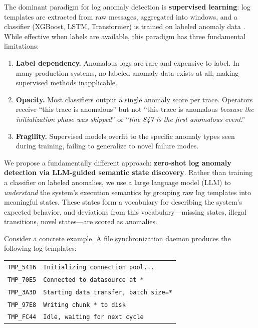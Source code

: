 \documentclass[11pt]{article}
\begin{document}
The dominant paradigm for log anomaly detection is \textbf{supervised learning}: log templates are extracted from raw messages, aggregated into windows, and a classifier (XGBoost, LSTM, Transformer) is trained on labeled anomaly data \cite{du2017deeplog,zhang2019robust,guo2021logbert}. While effective when labels are available, this paradigm has three fundamental limitations:

\begin{enumerate}[leftmargin=*,itemsep=2pt]
    \item \textbf{Label dependency.} Anomalous logs are rare and expensive to label. In many production systems, no labeled anomaly data exists at all, making supervised methods inapplicable.
    \item \textbf{Opacity.} Most classifiers output a single anomaly score per trace. Operators receive ``this trace is anomalous'' but not ``this trace is anomalous \emph{because the initialization phase was skipped}'' or ``\emph{line 847 is the first anomalous event}.''
    \item \textbf{Fragility.} Supervised models overfit to the specific anomaly types seen during training, failing to generalize to novel failure modes.
\end{enumerate}

We propose a fundamentally different approach: \textbf{zero-shot log anomaly detection via LLM-guided semantic state discovery}. Rather than training a classifier on labeled anomalies, we use a large language model (LLM) to \emph{understand} the system's execution semantics by grouping raw log templates into meaningful states. These states form a vocabulary for describing the system's expected behavior, and deviations from this vocabulary---missing states, illegal transitions, novel states---are scored as anomalies.

Consider a concrete example. A file synchronization daemon produces the following log templates:

\begin{center}
\begin{tabular}{ll}
\texttt{TMP\_5416} & \texttt{Initializing connection pool...} \\
\texttt{TMP\_70E5} & \texttt{Connected to datasource at *} \\
\texttt{TMP\_3A3D} & \texttt{Starting data transfer, batch size=*} \\
\texttt{TMP\_97E8} & \texttt{Writing chunk * to disk} \\
\texttt{TMP\_FC44} & \texttt{Idle, waiting for next cycle} \\
\end{tabular}
\end{center}
\end{document}
